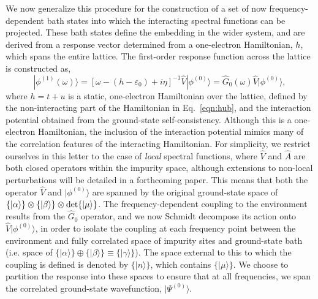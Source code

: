 \documentclass[aps,showpacs,twocolumn,nobibnotes]{revtex4}
\begin{document}
We now generalize this procedure for the construction of a set of now frequency-dependent bath states into which the interacting
spectral functions can be projected. These bath states define the embedding in the wider system, and are derived from
a response vector determined from a one-electron Hamiltonian, $h$, which spans the entire lattice.
The first-order response function across the lattice is constructed as,
\begin{equation}
|\phi^{(1)}(\omega) \rangle = \left[ \omega-(h-\varepsilon_0)+i\eta \right]^{-1} {\hat V} |\phi^{(0)}\rangle = 
    {\hat G_0}(\omega) {\hat V} |\phi^{(0)} \rangle  , \label{nonintGF}
\end{equation}
where $h = t + u$ is a static, one-electron Hamiltonian over the lattice, defined by the non-interacting part of the Hamiltonian 
in Eq.~\ref{eqn:hub}, and the interaction potential obtained from the ground-state self-consistency. 
Although this is a one-electron Hamiltonian, the inclusion of the interaction potential mimics many of the correlation features of the interacting Hamiltonian.
For simplicity, we restrict ourselves in this letter to the case of {\em local} spectral functions, where ${\hat V}$ and ${\hat A}$ are both closed operators
within the impurity space, although extensions to non-local perturbations will be detailed in a forthcoming paper. This means that both the operator 
${\hat V}$ and $|\phi^{(0)} \rangle$ are spanned by the original ground-state 
space of $\{ |\alpha \rangle \} \otimes \{ |\beta \rangle \} \otimes \text{\textnormal {det}} \{ | \mu \rangle \}$. The frequency-dependent coupling to the environment 
results from the ${\hat G_0}$ operator, and we now Schmidt decompose its action onto ${\hat V} |\phi^{(0)} \rangle$, in order to isolate 
the coupling at each frequency point between the environment and fully correlated space of impurity sites and ground-state bath (i.e. 
space of $\{|\alpha \rangle \} \oplus \{|\beta \rangle \} \equiv \{ | \gamma \rangle \}$). The space external to this to which the coupling is defined 
is denoted by $\{| n \rangle \}$, which contains $\{ | \mu \rangle \}$. We choose to partition the response into these spaces to ensure that at all 
frequencies, we span the correlated ground-state wavefunction, $|\Psi^{(0)} \rangle$.
\end{document}
